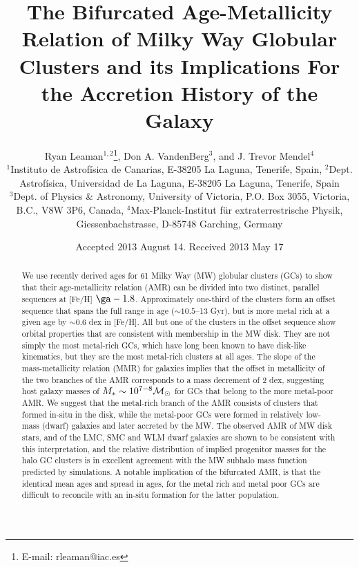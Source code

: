 \documentclass[useAMS,usenatbib]{mn2e}
\title[GC Assembly in the Milky Way]{The Bifurcated Age-Metallicity Relation of Milky Way Globular Clusters and its Implications For the Accretion History of the Galaxy}
\author[Leaman, VandenBerg, \& Mendel]{Ryan Leaman$^{1,2}$\thanks{E-mail:
rleaman@iac.es}, Don A. VandenBerg$^{3}$, and J. Trevor Mendel$^{4}$\\
$^{1}$Instituto de Astrof\'{i}sica de Canarias, E-38205 La Laguna, Tenerife, Spain, $^{2}$Dept. Astrof\'{i}sica, Universidad de La Laguna, E-38205 La Laguna, Tenerife, Spain\\ $^{3}$Dept. of Physics \& Astronomy, University of Victoria, P.O. Box 3055, Victoria, B.C., V8W 3P6, Canada, $^{4}$Max-Planck-Institut f\"{u}r extraterrestrische Physik, Giessenbachstrasse, D-85748 Garching, Germany}
\newcommand\msol{{{\cal M}_\odot}}
\begin{document}
\date{Accepted 2013 August 14. Received 2013 May 17}

\pagerange{\pageref{firstpage}--\pageref{lastpage}} 

\maketitle

\label{firstpage}

\begin{abstract}
We use recently derived ages for 61 Milky Way (MW) globular clusters (GCs) 
to show that their age-metallicity relation (AMR) can be divided into 
two distinct, parallel sequences at [Fe/H] $\ga -1.8$.  
Approximately one-third of the clusters form an offset sequence that spans the
full range in age ($\sim 10.5$--13 Gyr), 
but is more metal rich at a given age by
$\sim 0.6$ dex in [Fe/H].  All but one of the clusters in the offset sequence
show orbital properties that are consistent with membership in the MW
disk.  They are not simply the most metal-rich GCs, which have long been known
to have disk-like kinematics, but they are the most metal-rich clusters at all
ages.  The slope of
the mass-metallicity relation (MMR) for galaxies implies that the
offset in metallicity of the two branches of the AMR corresponds to a mass
decrement of 2 dex, suggesting host galaxy masses of $M_{*} \sim 10^{7-8} \msol$
for GCs that belong to the more metal-poor AMR.
We suggest that the metal-rich branch of the AMR consists of clusters 
that formed in-situ in the disk, while the metal-poor GCs were formed 
in relatively low-mass (dwarf) galaxies and later accreted by the MW.
The observed AMR of MW disk stars, and of the LMC, SMC and WLM dwarf 
galaxies are shown to be consistent with this interpretation, 
and the relative distribution of implied progenitor masses 
for the halo GC clusters is in excellent agreement with the 
MW subhalo mass function predicted by simulations.  A notable implication
of the bifurcated AMR, is that the identical mean ages and spread in ages,
for the metal rich and metal poor GCs are difficult to reconcile
with an in-situ formation for the latter population.

\end{abstract}
\end{document}
